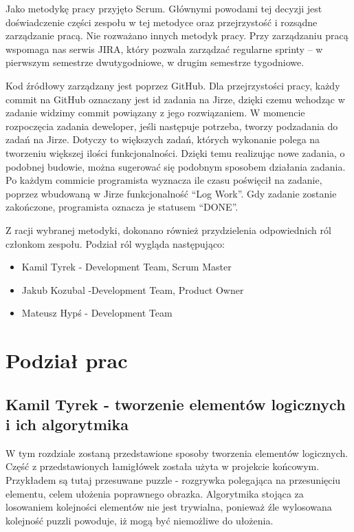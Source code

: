 \documentclass[oneside,polski,logo]{amuthesis}
\begin{document}
Jako metodykę pracy przyjęto Scrum. Głównymi powodami tej decyzji jest doświadczenie części zespołu w tej metodyce oraz przejrzystość i rozsądne zarządzanie pracą. Nie rozważano innych metodyk pracy. Przy zarządzaniu pracą wspomaga nas serwis JIRA, który pozwala zarządzać regularne sprinty – w pierwszym semestrze dwutygodniowe, w drugim semestrze tygodniowe. 


Kod źródłowy zarządzany jest poprzez GitHub. Dla przejrzystości pracy, każdy commit na GitHub oznaczany jest id zadania na Jirze, dzięki czemu wchodząc w zadanie widzimy commit powiązany z jego rozwiązaniem. W momencie rozpoczęcia zadania deweloper, jeśli następuje potrzeba, tworzy podzadania do zadań na Jirze. Dotyczy to większych zadań, których wykonanie polega na tworzeniu większej ilości funkcjonalności. Dzięki temu realizując nowe zadania, o podobnej budowie, można sugerować się podobnym sposobem działania zadania. Po każdym commicie programista wyznacza ile czasu poświęcił na zadanie, poprzez wbudowaną w Jirze funkcjonalność “Log Work”. Gdy zadanie zostanie zakończone, programista oznacza je statusem “DONE”.  


Z racji wybranej metodyki, dokonano również przydzielenia odpowiednich ról członkom zespołu. Podział ról wygląda następująco:

\begin{itemize}
	\item Kamil Tyrek - Development Team, Scrum Master
	\item Jakub Kozubal -Development Team, Product Owner
	\item Mateusz Hypś - Development Team
\end{itemize}

\section{Podział prac}
\subsection{Kamil Tyrek - tworzenie elementów logicznych i ich algorytmika}
W tym rozdziale zostaną przedstawione sposoby tworzenia elementów logicznych. Część z przedstawionych łamigłówek została użyta w projekcie końcowym. Przykładem są tutaj przesuwane puzzle - rozgrywka polegająca na przesunięciu elementu, celem ułożenia poprawnego obrazka. Algorytmika stojąca za losowaniem kolejności elementów nie jest trywialna, ponieważ źle wylosowana kolejność puzzli powoduje, iż mogą być niemożliwe do ułożenia.
\end{document}
